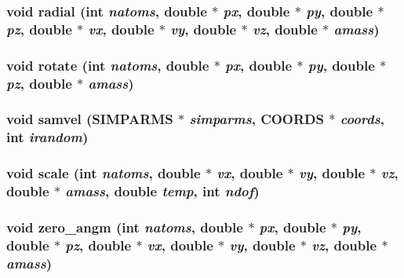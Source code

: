 \subsubsection{\setlength{\rightskip}{0pt plus 5cm}void radial (int {\em natoms}, double $\ast$ {\em px}, double $\ast$ {\em py}, double $\ast$ {\em pz}, double $\ast$ {\em vx}, double $\ast$ {\em vy}, double $\ast$ {\em vz}, double $\ast$ {\em amass})}\label{md__zeroam_8c_85ca07ac387b61031924cf97eb88a70a}


\subsubsection{\setlength{\rightskip}{0pt plus 5cm}void rotate (int {\em natoms}, double $\ast$ {\em px}, double $\ast$ {\em py}, double $\ast$ {\em pz}, double $\ast$ {\em amass})}\label{md__zeroam_8c_40422a104464277eb970aafd61ff78e5}


\subsubsection{\setlength{\rightskip}{0pt plus 5cm}void samvel ({\bf SIMPARMS} $\ast$ {\em simparms}, {\bf COORDS} $\ast$ {\em coords}, int {\em irandom})}\label{md__zeroam_8c_c8883bbca4402bb26e18ad034f1ab158}


\subsubsection{\setlength{\rightskip}{0pt plus 5cm}void scale (int {\em natoms}, double $\ast$ {\em vx}, double $\ast$ {\em vy}, double $\ast$ {\em vz}, double $\ast$ {\em amass}, double {\em temp}, int {\em ndof})}\label{md__zeroam_8c_33370ef880858acaaa5a6e9f053107f4}


\subsubsection{\setlength{\rightskip}{0pt plus 5cm}void zero\_\-angm (int {\em natoms}, double $\ast$ {\em px}, double $\ast$ {\em py}, double $\ast$ {\em pz}, double $\ast$ {\em vx}, double $\ast$ {\em vy}, double $\ast$ {\em vz}, double $\ast$ {\em amass})}\label{md__zeroam_8c_1059b368913ab3833db0c39b8807c63b}


